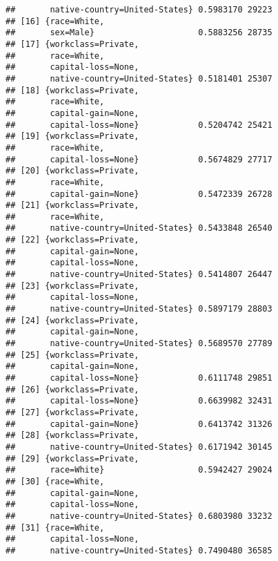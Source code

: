 \documentclass[]{article}
\begin{document}
\begin{verbatim}
##       native-country=United-States} 0.5983170 29223
## [16] {race=White,                                  
##       sex=Male}                     0.5883256 28735
## [17] {workclass=Private,                           
##       race=White,                                  
##       capital-loss=None,                           
##       native-country=United-States} 0.5181401 25307
## [18] {workclass=Private,                           
##       race=White,                                  
##       capital-gain=None,                           
##       capital-loss=None}            0.5204742 25421
## [19] {workclass=Private,                           
##       race=White,                                  
##       capital-loss=None}            0.5674829 27717
## [20] {workclass=Private,                           
##       race=White,                                  
##       capital-gain=None}            0.5472339 26728
## [21] {workclass=Private,                           
##       race=White,                                  
##       native-country=United-States} 0.5433848 26540
## [22] {workclass=Private,                           
##       capital-gain=None,                           
##       capital-loss=None,                           
##       native-country=United-States} 0.5414807 26447
## [23] {workclass=Private,                           
##       capital-loss=None,                           
##       native-country=United-States} 0.5897179 28803
## [24] {workclass=Private,                           
##       capital-gain=None,                           
##       native-country=United-States} 0.5689570 27789
## [25] {workclass=Private,                           
##       capital-gain=None,                           
##       capital-loss=None}            0.6111748 29851
## [26] {workclass=Private,                           
##       capital-loss=None}            0.6639982 32431
## [27] {workclass=Private,                           
##       capital-gain=None}            0.6413742 31326
## [28] {workclass=Private,                           
##       native-country=United-States} 0.6171942 30145
## [29] {workclass=Private,                           
##       race=White}                   0.5942427 29024
## [30] {race=White,                                  
##       capital-gain=None,                           
##       capital-loss=None,                           
##       native-country=United-States} 0.6803980 33232
## [31] {race=White,                                  
##       capital-loss=None,                           
##       native-country=United-States} 0.7490480 36585

\end{verbatim}
\end{document}
